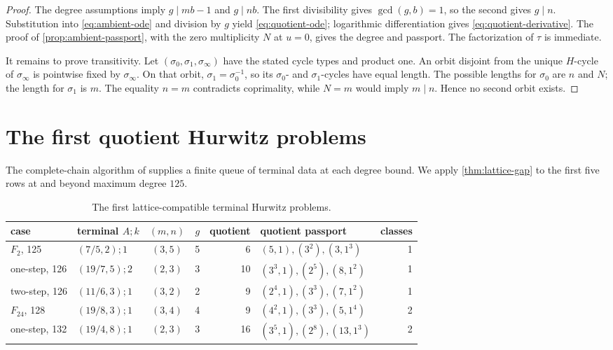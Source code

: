 \documentclass[11pt,reqno]{amsart}
\begin{document}
\begin{proof}
The degree assumptions imply \(g\mid mb-1\) and \(g\mid nb\).
The first divisibility gives \(\gcd(g,b)=1\), so the second gives \(g\mid n\).
Substitution into \eqref{eq:ambient-ode} and division by \(g\) yield
\eqref{eq:quotient-ode}; logarithmic differentiation gives
\eqref{eq:quotient-derivative}.  The proof of
\cref{prop:ambient-passport}, with the zero multiplicity \(N\) at \(u=0\),
gives the degree and passport.  The factorization of \(\tau\) is immediate.

It remains to prove transitivity.  Let
\((\sigma_0,\sigma_1,\sigma_\infty)\) have the stated cycle types and
product one.  An orbit disjoint from the unique \(H\)-cycle of
\(\sigma_\infty\) is pointwise fixed by \(\sigma_\infty\).  On that orbit,
\(\sigma_1=\sigma_0^{-1}\), so its \(\sigma_0\)- and
\(\sigma_1\)-cycles have equal length.  The possible lengths for
\(\sigma_0\) are \(n\) and \(N\); the length for \(\sigma_1\) is \(m\).
The equality \(n=m\) contradicts coprimality, while \(N=m\) would imply
\(m\mid n\).  Hence no second orbit exists.
\end{proof}

\section{The first quotient Hurwitz problems}
\label{sec:queue}

The complete-chain algorithm of
\cite{guccioneEtAl2017algorithms,guccioneEtAl2022degree108} supplies a
finite queue of terminal data at each degree bound.  We apply
\cref{thm:lattice-gap} to the first five rows at and beyond maximum degree
\(125\).

\begin{table}[ht]
\centering
\small
\begin{tabular}{@{}llcrrlr@{}}
\toprule
case & terminal \(A;k\) & \((m,n)\) & \(g\) & quotient
& quotient passport & classes\\
\midrule
\(F_2\), 125
& \((7/5,2);1\) & \((3,5)\) & 5 & 6
& \((5,1),(3^2),(3,1^3)\) & 1\\
one-step, 126
& \((19/7,5);2\) & \((2,3)\) & 3 & 10
& \((3^3,1),(2^5),(8,1^2)\) & 1\\
two-step, 126
& \((11/6,3);1\) & \((3,2)\) & 2 & 9
& \((2^4,1),(3^3),(7,1^2)\) & 1\\
\(F_{24}\), 128
& \((19/8,3);1\) & \((3,4)\) & 4 & 9
& \((4^2,1),(3^3),(5,1^4)\) & 2\\
one-step, 132
& \((19/4,8);1\) & \((2,3)\) & 3 & 16
& \((3^5,1),(2^8),(13,1^3)\) & 2\\
\bottomrule
\end{tabular}
\caption{The first lattice-compatible terminal Hurwitz problems.}
\label{tab:queue}
\end{table}
\end{document}
